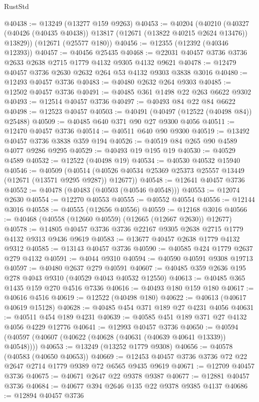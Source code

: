 \begin{lexlean}{RustStd}
\begin{coremodule}
@40438 := @13249 (@13277 @159 @9263)
@40453 := @40204
    (@40210 (@40327 (@40426 (@40435 @40438)) @13817 (@12671 (@13822 @40215 @2624 @13476)) @13829))
    (@12671 (@25577 @180))
@40456 := @12355 (@12392 (@40346 @12393))
@40457 := @40456 @25435
@40468 := @22031 @40457 @3736 @3736 @2633 @2638 @2715 @1779 @4132 @9305 @4132 @9621
@40478 := @12479 @40457 @3736 @2630 @2632 @264 @53 @4132 @9303 @3838 @3016
@40480 := @12493 @40457 @3736
@40483 := @40480 @2632 @264 @9303
@40485 := @12502 @40457 @3736
@40491 := @40485 @361 @1498 @22 @263 @6622 @9302
@40493 := @12514 @40457 @3736
@40497 := @40493 @84 @22 @84 @6622
@40498 := @12523 @40457
@40503 := @40491 (@40497 (@12522 (@40498 @84)) @25488)
@40509 := @40485 @640 @371 @90 @27 @9300 @4056
@40511 := @12470 @40457 @3736
@40514 := @40511 @640 @90 @9300
@40519 := @13492 @40457 @3736 @3838 @359 @194
@40526 := @40519 @84 @265 @90 @4589 @4077 @9286 @9295
@40529 := @40493 @19 @195 @19
@40530 := @40529 @4589
@40532 := @12522 (@40498 @19)
@40534 := @40530 @40532 @15940
@40546 := @40509
    (@40514 (@40526 @40534 @25369 @25373 @25557 @13449 (@12671 (@13571 @9295 @9287)) @12677))
@40548 := @12641 @40457 @3736
@40552 := @40478 (@40483 (@40503 (@40546 @40548)))
@40553 := @12074 @2630
@40554 := @12270 @40553
@40555 := @40552 @40554
@40556 := @12144 @3016
@40558 := @40555 (@12656 @40556)
@40559 := @12168 @3016
@40566 := @40468 (@40558 (@12660 @40559) (@12665 (@12667 @2630)) @12677)
@40578 := @14805 @40457 @3736 @3736 @22167 @9305 @2638 @2715 @1779 @4132 @9313 @9436 @9619
@40583 := @13677 @40457 @2638 @1779 @4132 @9312
@40585 := @13143 @40457 @3736
@40590 := @40585 @424 @1779 @2637 @279 @4132
@40591 := @4044 @9310
@40594 := @40590 @40591 @9308 @19713
@40597 := @40480 @2637 @279 @40591
@40607 := @40485 @359 @2636 @195 @278 @4043 @9310 (@40529 @4043 @40532 @12550)
@40613 := @40485 @365 @1435 @159 @270 @4516 @7336
@40616 := @40493 @180 @159 @180
@40617 := @40616 @4516
@40619 := @12522 (@40498 @180)
@40622 := @40613 (@40617 @40619 @15128)
@40628 := @40485 @454 @371 @189 @27 @4231 @4056
@40631 := @40511 @454 @189 @4231
@40639 := @40585 @451 @189 @371 @27 @4132 @4056 @4229 @12776
@40641 := @12993 @40457 @3736
@40650 := @40594 (@40597 (@40607 (@40622 (@40628 (@40631 (@40639 @40641 @13339)) @40548))))
@40653 := @13249 (@13252 @1779 @9308)
@40656 := @40578 (@40583 (@40650 @40653))
@40669 := @12453 @40457 @3736 @3736 @72 @22 @2647 @2714 @1779 @9389 @72 @6565 @9435 @9619
@40671 := @12709 @40457 @3736
@40675 := @40671 @2647 @22 @9378 @9387
@40677 := @12881 @40457 @3736
@40684 := @40677 @394 @2646 @135 @22 @9378 @9385 @4137
@40686 := @12894 @40457 @3736

\end{coremodule}
\end{lexlean}
